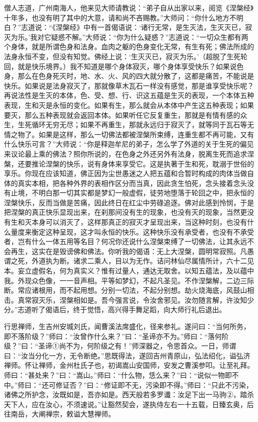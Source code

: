 \documentclass[12pt,twoside,openany]{book}
\newcommand{\kai}[1]{{\CJKfamily{kai}#1}}
\begin{document}
\kai{僧人志道，广州南海人，他来见大师请教说：“弟子自从出家以来，阅览《涅槃经》十年多，也没有明了其中的大意，请和尚不吝赐教。”大师问：“你什么地方不明白？”志道说：“《涅槃经》中有一首偈语说：‘诸行无常，是生灭法，生灭灭已，寂灭为乐。’我对它疑惑不解。”大师说：“你为什么疑惑？”志道说：“一切众生都有两个身体，就是所谓色身和法身。血肉之躯的色身变化无常，有生有死；佛法所成的法身永恒不变，但没有知觉。佛经上说：‘生灭灭已，寂灭为乐。’（超脱了生死轮回，就是快乐境界。）我不知道是哪个身体寂灭，哪个身体享受快乐？如果说色身，那么在色身死灭时，地、水、火、风的四大就分散了，这都是痛苦，不能说是快乐。如果说是法身寂灭了，那就像草木瓦石一样没有感觉，那是谁享受快乐呢？再说法性是生灭的本体，色、受、想、行、识这五蕴是生灭的表现，一个本体五种表现，生和灭是永恒的变化。如果有生，那么就会从本体中产生这五种表现；如果要灭，那么五种表现就会返回本体。如果听任它反复重生，那就是有情有感的众生，生死循环无穷无尽；如果不再重生，那就永远归于寂灭了，就等同于瓦石等无情之物了。如果是这样，那么一切佛法都被涅槃所束缚，连重生都不再可能，又有什么快乐可言？”大师说：“你是释迦牟尼的弟子，怎么学了外道的关于生死的偏见来议论最上乘的佛法？照你所说的，在色身之外还另外有法身，脱离生死而追求涅槃，还要推论涅槃的快乐，说有身体来享受它。这是执著于生和死，耽溺于世俗的享乐。你现在应该知道，佛正因为尘世愚迷之人把五蕴和合暂时构成的肉体当做自体的真实本相，把各种外界的表相作区分而当真，因此贪生怕死，念头接着念头没有止境，不明白那一切其实都是梦幻一般虚假，徒劳地堕落于轮回之中，把永恒的涅槃快乐，反而当做是苦痛，因此终日在红尘中劳碌追逐。佛对此感到怜悯，于是把涅槃的真正快乐显现出来，在刹那间没有生的现象，也没有灭的现象，当然更没有生和灭本身可以消灭了，这样那真正的寂灭才呈现出来，当这种时刻，也没有什么量度来衡定这种呈现，这才叫永恒的快乐。这种快乐没有承受者，也没有不承受者，岂有什么一体五用等名目？何况你还说什么涅槃束缚了一切佛法，让其永远不会再生，这实在是毁谤佛和佛法。你听我的偈语：无上大涅槃，圆明常寂照。凡愚谓之死，外道执为断。诸求二乘人，目以为无作。诘问林仙尽属情所计，六十二见本。妄立虚假名，何为真实义？惟有过量人，通达无取舍。以知五蕴法，及以蕴中我。外现众色像，一一音声相。平等如梦幻，不起凡圣见。不作涅槃解，二边三际断。常应诸根用，而不起用想。分别一切法，不起分别想。劫火烧海底，风鼓山相击。真常寂灭乐，涅槃相如是。吾今强言说，令汝舍邪见。汝勿随言解，许汝知少分。”志道听了偈语后，终于觉悟，高兴得手舞足蹈，向大师行礼后退出。}

行思禅师，生吉州安城刘氏，闻曹溪法席盛化，径来参礼。遂问曰：“当何所务，即不落阶级？”师曰：“汝曾作什么来？”曰：“圣谛亦不为。”师曰：“落何阶级？”曰：“圣谛①尚不为，何阶级之有！”师深器之，令思首众。一日，师谓曰：“汝当分化一方，无令断绝。”思既得法，遂回吉州青原山，弘法绍化，谥弘济禅师。怀让禅师，金州杜氏子也，初谒嵩山安国师，安发之曹溪参叩。让至礼拜。师曰：“甚处来？”曰：“嵩山。”师曰：“什么物，恁么来？”曰：“说似一物即不中。”师曰：“还可修证否？”曰：“修证即不无，污染即不得。”师曰：“只此不污染，诸佛之所护念，汝既如是，吾亦如是。西天般若多罗谶：汝足下出一马驹②，踏杀天下人，应在汝心，不须速说。”让豁然契会，遂执侍左右一十五载，日臻玄奥，后往南岳，大阐禅宗，敕谥大慧禅师。
\end{document}
